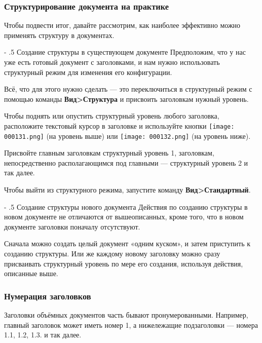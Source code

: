 ﻿\documentclass[a4paper,10pt]{article}
\makeatletter
\renewcommand\paragraph{%
   \@startsection{paragraph}{4}{0mm}%
      {-\baselineskip}%
      {.5\baselineskip}%
      {\normalfont\normalsize\bfseries}}
\makeatother
\begin{document}
\subsubsection{Структурирование документа на практике}
Чтобы подвести итог, давайте рассмотрим, как наиболее эффективно можно применять структуру в документах.

\paragraph{Создание структуры в существующем документе}
Предположим, что у нас уже есть готовый документ с заголовками, и нам нужно использовать структурный режим для изменения его конфигурации.

Всё, что для этого нужно сделать — это переключиться в структурный режим с помощью команды \textbf{Вид>Структура} и присвоить заголовкам нужный уровень.

Чтобы поднять или опустить структурный уровень любого заголовка, расположите текстовый курсор в заголовке и используйте кнопки \texttt{[image: 000131.png]} (на уровень выше) или \texttt{[image: 000132.png]} (на уровень ниже).

Присвойте главным заголовкам структурный уровень 1, заголовкам, непосредственно располагающимся под главными — структурный уровень 2 и так далее.

Чтобы выйти из структурного режима, запустите команду \textbf{Вид>Стандартный}.

\paragraph{Создание структуры нового документа}
Действия по созданию структуры в новом документе не отличаются от вышеописанных, кроме того, что в новом документе заголовки поначалу отсутствуют.

Сначала можно создать целый документ «одним куском», и затем приступить к созданию структуры. Или же каждому новому заголовку можно сразу присваивать структурный уровень по мере его создания, используя действия, описанные выше.

\subsubsection{Нумерация заголовков} \label{sec:нумерациязаголовков}
Заголовки объёмных документов часть бывают пронумерованными. Например, главный заголовок может иметь номер 1, а нижележащие подзаголовки — номера 1.1, 1.2, 1.3. и так далее.
\end{document}
